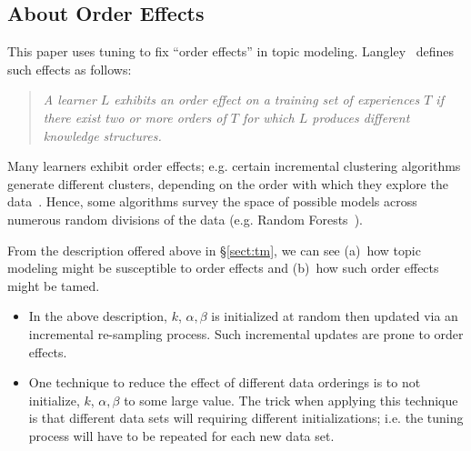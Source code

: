 \documentclass[10pt,conference]{IEEEtran}
\newcommand{\bi}{\begin{itemize}}
\newcommand{\ei}{\end{itemize}}
\theoremstyle{break}
\begin{document}
\subsection{About Order Effects}

\noindent
This paper uses tuning to fix ``order effects'' in topic modeling. Langley~\cite{GENNARI198911} defines such effects as follows:
\begin{quote}
{\em A learner $L$ exhibits an order effect on a training set of experiences $T$ if there exist
two or more orders of $T$ for which $L$ produces different knowledge structures.}
\end{quote}
Many learners exhibit order effects; e.g. certain incremental clustering algorithms generate different
clusters, depending on the order with which they explore the data~\cite{GENNARI198911}.
Hence, some algorithms survey the space of possible models across numerous
random divisions of the data (e.g. Random Forests~\cite{Breiman2001}).

From the description offered above in \S\ref{sect:tm},
we can see (a)~how topic modeling might be susceptible to order effects and (b)~how such order
effects might be tamed.
\bi
\item
  In the above description, $k$, $\alpha,\beta$ is initialized at random
then updated via an incremental re-sampling process. Such incremental updates are prone to order effects.
\item
  One technique to reduce the effect of different data orderings is to not initialize, $k$, $\alpha,\beta$ to some
  large value. The trick when applying this technique is that different data sets will requiring different
  initializations; i.e. the tuning process will have to be repeated for each new data set.
\ei
  





\end{document}
